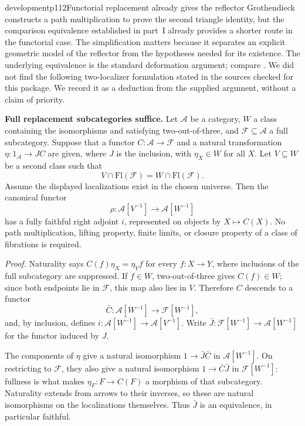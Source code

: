 \begin{dcomment}{development}{p112}{Functorial replacement already gives the reflector}
Grothendieck constructs a path multiplication to prove the second triangle identity, but the comparison equivalence established in part~I already provides a shorter route in the functorial case. The simplification matters because it separates an explicit geometric model of the reflector from the hypotheses needed for its existence. The underlying equivalence is the standard deformation argument; compare \citet[Definition~2.2.1 and Remark~2.2.2, with arrows reversed]{Riehl2014}. We did not find the following two-localizer formulation stated in the sources checked for this package. We record it as a deduction from the supplied argument, without a claim of priority.

\textbf{Full replacement subcategories suffice.}\ours\quad
Let $\mathcal A$ be a category, $W$ a class containing the isomorphisms and satisfying two-out-of-three, and $\mathcal F\subseteq\mathcal A$ a full subcategory. Suppose that a functor $C:\mathcal A\to\mathcal F$ and a natural transformation $\eta:1_{\mathcal A}\to JC$ are given, where $J$ is the inclusion, with $\eta_X\in W$ for all $X$. Let $V\subseteq W$ be a second class such that
\[
V\cap\mathrm{Fl}(\mathcal F)=W\cap\mathrm{Fl}(\mathcal F).
\]
Assume the displayed localizations exist in the chosen universe. Then the canonical functor
\[
\rho:\mathcal A[V^{-1}]\longrightarrow\mathcal A[W^{-1}]
\]
has a fully faithful right adjoint $i$, represented on objects by $X\mapsto C(X)$. No path multiplication, lifting property, finite limits, or closure property of a class of fibrations is required.

\textit{Proof.}
Naturality says $C(f)\eta_X=\eta_Yf$ for every $f:X\to Y$, where inclusions of the full subcategory are suppressed. If $f\in W$, two-out-of-three gives $C(f)\in W$; since both endpoints lie in $\mathcal F$, this map also lies in $V$. Therefore $C$ descends to a functor
\[
\bar C:\mathcal A[W^{-1}]\longrightarrow\mathcal F[W^{-1}],
\]
and, by inclusion, defines $i:\mathcal A[W^{-1}]\to\mathcal A[V^{-1}]$. Write $\bar J:\mathcal F[W^{-1}]\to\mathcal A[W^{-1}]$ for the functor induced by $J$.

The components of $\eta$ give a natural isomorphism $1\to\bar J\bar C$ in $\mathcal A[W^{-1}]$. On restricting to $\mathcal F$, they also give a natural isomorphism $1\to\bar C\bar J$ in $\mathcal F[W^{-1}]$: fullness is what makes $\eta_F:F\to C(F)$ a morphism of that subcategory. Naturality extends from arrows to their inverses, so these are natural isomorphisms on the localizations themselves. Thus $\bar J$ is an equivalence, in particular faithful.


\end{dcomment}
